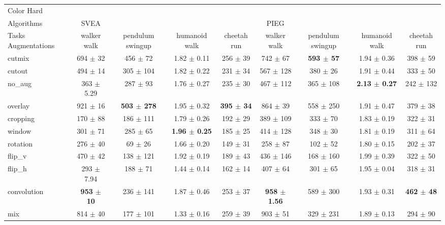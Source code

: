 \begin{tabular}{lcccccccc}
Color Hard & & & & & & & & \\
Algorithms & SVEA & & & & PIEG & & & \\
Tasks Augmentations & walker walk & pendulum swingup & humanoid walk & cheetah run & walker walk & pendulum swingup & humanoid walk & cheetah run \\
cutmix          & 694 $\pm$ 32 & 456 $\pm$ 72 & 1.82 $\pm$ 0.11 & 256 $\pm$ 39 & 742 $\pm$ 67 & \textbf{593 $\pm$ 57} & 1.94 $\pm$ 0.36 & 398 $\pm$ 59 \\
cutout          & 494 $\pm$ 14 & 305 $\pm$ 104 & 1.82 $\pm$ 0.22 & 231 $\pm$ 34 & 567 $\pm$ 128 & 380 $\pm$ 26 & 1.91 $\pm$ 0.44 & 333 $\pm$ 50 \\
no\_aug         & 363 $\pm$ 5.29 & 287 $\pm$ 93 & 1.76 $\pm$ 0.27 & 235 $\pm$ 30 & 467 $\pm$ 112 & 365 $\pm$ 108 & \textbf{2.13 $\pm$ 0.27} & 242 $\pm$ 132 \\
overlay         & 921 $\pm$ 16 & \textbf{503 $\pm$ 278} & 1.95 $\pm$ 0.32 & \textbf{395 $\pm$ 34} & 864 $\pm$ 39 & 558 $\pm$ 250 & 1.91 $\pm$ 0.47 & 379 $\pm$ 38 \\
cropping        & 170 $\pm$ 88 & 186 $\pm$ 111 & 1.79 $\pm$ 0.26 & 192 $\pm$ 29 & 389 $\pm$ 109 & 333 $\pm$ 70 & 1.83 $\pm$ 0.19 & 322 $\pm$ 31 \\
window          & 301 $\pm$ 71 & 285 $\pm$ 65 & \textbf{1.96 $\pm$ 0.25} & 185 $\pm$ 25 & 414 $\pm$ 128 & 348 $\pm$ 30 & 1.81 $\pm$ 0.19 & 311 $\pm$ 64 \\
rotation        & 276 $\pm$ 40 & 69 $\pm$ 26 & 1.66 $\pm$ 0.20 & 149 $\pm$ 31 & 258 $\pm$ 87 & 102 $\pm$ 52 & 1.80 $\pm$ 0.15 & 202 $\pm$ 37 \\
flip\_v         & 470 $\pm$ 42 & 138 $\pm$ 121 & 1.92 $\pm$ 0.19 & 189 $\pm$ 43 & 436 $\pm$ 146 & 168 $\pm$ 160 & 1.99 $\pm$ 0.39 & 322 $\pm$ 50 \\
flip\_h         & 293 $\pm$ 7.94 & 188 $\pm$ 71 & 1.44 $\pm$ 0.14 & 162 $\pm$ 14 & 407 $\pm$ 64 & 301 $\pm$ 65 & 1.95 $\pm$ 0.04 & 318 $\pm$ 31 \\
convolution     & \textbf{953 $\pm$ 10} & 236 $\pm$ 141 & 1.87 $\pm$ 0.46 & 253 $\pm$ 37 & \textbf{958 $\pm$ 1.56} & 589 $\pm$ 300 & 1.93 $\pm$ 0.31 & \textbf{462 $\pm$ 48} \\
mix             & 814 $\pm$ 40 & 177 $\pm$ 101 & 1.33 $\pm$ 0.16 & 259 $\pm$ 39 & 903 $\pm$ 51 & 329 $\pm$ 231 & 1.89 $\pm$ 0.13 & 294 $\pm$ 90 \\
\end{tabular}